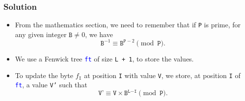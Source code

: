 \documentclass{beamer}
\makeatletter
\newcommand{\uvalink}[2]{UVa Online Judge (http://uva.onlinejudge.org)
  problem number \href{#2}{\textcolor{blue}{#1}.}}
\newcommand{\hint}[1]{
\begin{bclogo}[arrondi=0.1, logo=\bclampe]{Hint}
#1
\end{bclogo}
}
\newcounter{exo}
\newcommand{\exo}{
  \addtocounter{exo}{1}
  Exercice \arabic{exo}
}
\newcommand*{\Rmnum}[1]{\expandafter\@slowromancap\romannumeral #1@}
\makeatother
\begin{document}
\fi


\ifanswers

\begin{frame}%
\frametitle{Solution}

\footnotesize

\begin{itemize}

\item From the mathematics section, we need to remember that if \texttt{P} is prime, for any given integer $\texttt{B} \ne 0$,
we have
$$
\texttt{B}^{-1} \equiv \texttt{B}^{\texttt{P} - 2} \pmod{\texttt{P}}.
$$

\vspace{0.1cm}

\item<2-> We use a Fenwick tree \textcolor{blue}{\texttt{ft}} of size \texttt{L + 1}, to store the values.

\vspace{0.2cm}

\item<3-> To update the byte $f_{\texttt{I}}$ at position \texttt{I} with value \texttt{V}, we store, at position \texttt{I} of \textcolor{blue}{\texttt{ft}},
a value \texttt{V'} such that
$$
\texttt{V'} \equiv \texttt{V} \times \texttt{B}^{\texttt{L} - \texttt{I}} \pmod{\texttt{P}}.
$$

\vspace{-0.2cm}


\end{itemize}


\end{frame}
\end{document}
